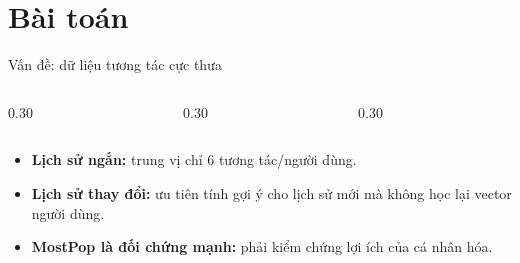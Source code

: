\section{Bài toán}

\begin{frame}{Vấn đề: dữ liệu tương tác cực thưa}

\begin{columns}[T,onlytextwidth]

\begin{column}{0.30\textwidth}
\end{column}
\hfill
\begin{column}{0.30\textwidth}
\end{column}
\hfill
\begin{column}{0.30\textwidth}
\end{column}

\end{columns}
\vspace{0.28cm}
\begin{itemize}\setlength\itemsep{10pt}
\item \textbf{Lịch sử ngắn:} trung vị chỉ 6 tương tác/người dùng.
\item \textbf{Lịch sử thay đổi:} ưu tiên tính gợi ý cho lịch sử mới mà không học lại vector người dùng.
\item \textbf{MostPop là đối chứng mạnh:} phải kiểm chứng lợi ích của cá nhân hóa.
\end{itemize}
\end{frame}

